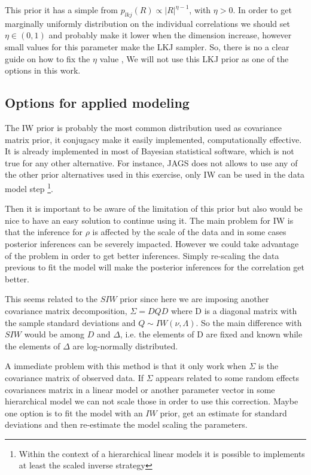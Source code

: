 \documentclass[a4paper]{article}
\begin{document}
This prior it has a simple from $p_{lkj}(R) \propto |R|^{\eta-1}$, with $\eta > 0$. In order to get marginally uniformly distribution on the individual correlations we should  set $\eta \in (0,1)$ and probably make it lower when the dimension increase, however small values for this parameter make the LKJ sampler. So, there is no a clear guide on how to fix the $\eta$ value , We will not use this LKJ prior as one of the options in this work. 

\subsection{Options for applied modeling}

The IW prior is probably the most common distribution used as covariance matrix prior, it conjugacy make it easily implemented, computationally effective. It is already implemented in most of Bayesian statistical software, which is not true for any other alternative. For instance, JAGS does not allows to use any of the other prior alternatives used in this exercise, only IW can be used in the data model step \footnote{Within the context of a hierarchical linear models it is possible to implements at least the scaled inverse strategy}.  

Then it is important to be aware of the limitation of this prior but also would be nice to have an easy solution to continue using it. The main problem for IW is that the inference for $\rho$ is affected by the scale of the data and in some cases posterior inferences can be severely impacted. However we could take advantage of the problem in order to get better inferences. Simply re-scaling the data previous to fit the model will make the posterior inferences for the correlation get better. 

This seems related to the $SIW$ prior since here we are imposing another covariance matrix decomposition, $\Sigma = DQD$ where D is a diagonal matrix with the sample standard deviations and $Q\sim IW(\nu, \Lambda)$. So the main difference with $SIW$ would be among $D$ and $\Delta$, i.e. the elements of D are fixed and known while the elements of $\Delta$ are log-normally distributed. 

A immediate problem with this method is that it only work when $\Sigma$ is the covariance matrix of observed data. If $\Sigma$ appears related to some random effects covariances matrix in a linear model or another parameter vector in some hierarchical model we can not scale those in order to use this correction.  Maybe one option is to fit the model with an $IW$ prior, get an estimate for standard deviations and then re-estimate the model scaling the parameters.
\end{document}
